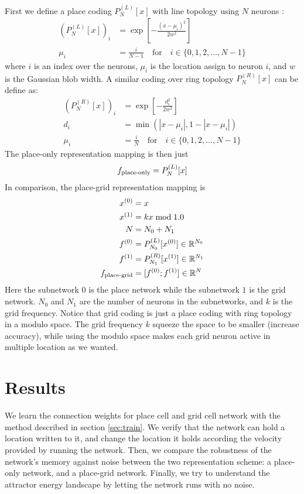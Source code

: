 First we define a place coding $P^{(L)}_N[x]$ with line topology using $N$ neurons :
\begin{align}
\left( P^{(L)}_N[x] \right)_i &= \exp\left[
	-\frac{(x - \mu_i)^2}{2w^2}
\right] \\
\mu_i &= \frac{i}{N - 1}
	\quad\text{for}\quad i \in \{0, 1, 2, \dots, N-1\}
\end{align}
where $i$ is an index over the neurons, $\mu_i$ is the location assign to neuron $i$, and $w$ is the Gaussian blob width. A similar coding over ring topology $P^{(R)}_N[x]$ can be define as:
\begin{align}
\left( P^{(R)}_N[x] \right)_i &= \exp\left[
	-\frac{d_i^2}{2w^2}
\right] \\
d_i &= \min \left( |x - \mu_i|, 1 - |x - \mu_i| \right) \\
\mu_i &= \frac{i}{N}
	\quad\text{for}\quad i \in \{0, 1, 2, \dots, N-1\}
\end{align}
The place-only representation mapping is then just
\begin{equation}
f_{\text{\scriptsize{place-only}}} = P^{(L)}_N[x]
\end{equation}
In comparison, the place-grid representation mapping is
\begin{align}
x^{(0)} &= x \\
x^{(1)} &= kx \;\text{mod}\; 1.0 \\
N &= N_0 + N_1 \\
f^{(0)} &= P^{(L)}_{N_0}[x^{(0)}] \in \mathbb{R}^{N_0} \\
f^{(1)} &= P^{(R)}_{N_1}[x^{(1)}] \in \mathbb{R}^{N_1} \\
f_{\text{\scriptsize{place-grid}}} &= [f^{(0)}; f^{(1)}] \in \mathbb{R}^{N}
\end{align}
Here the subnetwork $0$ is the place network while the subnetwork $1$ is the grid network. $N_0$ and $N_1$ are the number of neurons in the subnetworks, and $k$ is the grid frequency. Notice that grid coding is just a place coding with ring topology in a modulo space. The grid frequency $k$ squeeze the space to be smaller (increase accuracy), while using the modulo space makes each grid neuron active in multiple location as we wanted.

\section{Results}
\label{sec:results}

We learn the connection weights for place cell and grid cell network with the method described in section \ref{sec:train}. We verify that the network can hold a location written to it, and change the location it holds according the velocity provided by running the network. Then, we compare the robustness of the network's memory against noise between the two representation scheme: a place-only network, and a place-grid network. Finally, we try to understand the attractor energy landscape by letting the network runs with no noise.

